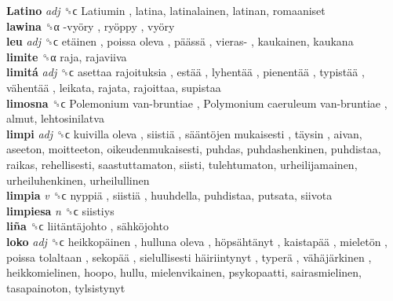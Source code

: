 \textbf{Latino} \emph{adj}  ␝ϲ   Latiumin , latina, latinalainen, latinan, romaaniset  \\
\textbf{lawina} ␝α   -vyöry ,  ryöppy ,  vyöry   \\
\textbf{leu} \emph{adj}  ␝ϲ   etäinen ,  poissa oleva ,  päässä ,  vieras- , kaukainen, kaukana  \\
\textbf{limite} ␝α  raja, rajaviiva  \\
\textbf{limitá} \emph{adj}  ␝ϲ   asettaa rajoituksia ,  estää ,  lyhentää ,  pienentää ,  typistää ,  vähentää , leikata, rajata, rajoittaa, supistaa  \\
\textbf{limosna} ␝ϲ   Polemonium van-bruntiae ,  Polymonium caeruleum van-bruntiae , almut, lehtosinilatva  \\
\textbf{limpi} \emph{adj}  ␝ϲ   kuivilla oleva ,  siistiä ,  sääntöjen mukaisesti ,  täysin , aivan, aseeton, moitteeton, oikeudenmukaisesti, puhdas, puhdashenkinen, puhdistaa, raikas, rehellisesti, saastuttamaton, siisti, tulehtumaton, urheilijamainen, urheiluhenkinen, urheilullinen  \\
\textbf{limpia} \emph{v}  ␝ϲ   nyppiä ,  siistiä , huuhdella, puhdistaa, putsata, siivota  \\
\textbf{limpiesa} \emph{n}  ␝ϲ  siistiys  \\
\textbf{liña} ␝ϲ   liitäntäjohto ,  sähköjohto   \\
\textbf{loko} \emph{adj}  ␝ϲ   heikkopäinen ,  hulluna oleva ,  höpsähtänyt ,  kaistapää ,  mieletön ,  poissa tolaltaan ,  sekopää ,  sielullisesti häiriintynyt ,  typerä ,  vähäjärkinen , heikkomielinen, hoopo, hullu, mielenvikainen, psykopaatti, sairasmielinen, tasapainoton, tylsistynyt  \\

